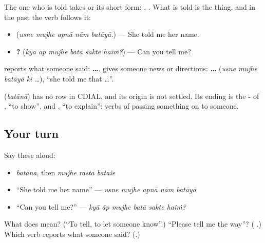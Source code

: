 The one who is told takes \textbf{} or its short form: \textbf{}, \textbf{}. What is told is the thing, and in the past the verb follows it:

\begin{itemize}
\raggedright
  \item \textbf{    } (\emph{usne mujhe apnā nām batāyā.}) — She told me her name.
  \item \textbf{     ?} (\emph{kyā āp mujhe batā sakte haiṁ?}) — Can you tell me?
\end{itemize}

\textbf{} reports what someone said: \textbf{   …}. \textbf{} gives someone news or directions: \textbf{    …} (\emph{usne mujhe batāyā ki …}), \textquotedblleft{}she told me that …\textquotedblright{}.

\begin{cousinweb}
\textbf{} (\emph{batānā}) has no row in CDIAL, and its origin is not settled. Its ending is the \textbf{-} of \textbf{}, \textquotedblleft{}to show\textquotedblright{}, and \textbf{}, \textquotedblleft{}to explain\textquotedblright{}: verbs of passing something on to someone.
\end{cousinweb}

\subsection*{Your turn}
Say these aloud:

\begin{itemize}
\raggedright
  \item \emph{batānā}, then \emph{mujhe rāstā batāie}
  \item \textquotedblleft{}She told me her name\textquotedblright{} — \emph{usne mujhe apnā nām batāyā}
  \item \textquotedblleft{}Can you tell me?\textquotedblright{} — \emph{kyā āp mujhe batā sakte haiṁ?}
\end{itemize}

\begin{tcolorbox}[breakable,colback=teal!4,colframe=teal!35!black,title={Before you move on}]
What does \textbf{} mean? (\textquotedblleft{}To tell, to let someone know\textquotedblright{}.) \textquotedblleft{}Please tell me the way\textquotedblright{}? (\textbf{  }.) Which verb reports what someone said? (\textbf{}.)
\end{tcolorbox}
